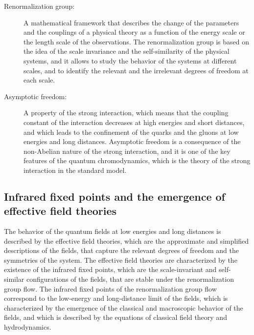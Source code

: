 \begin{tcolorbox}[colback=blue!5!white,colframe=blue!75!black,title=New terms]
\begin{description}
\item[Renormalization group:] A mathematical framework that describes the change of the parameters and the couplings of a physical theory as a function of the energy scale or the length scale of the observations. The renormalization group is based on the idea of the scale invariance and the self-similarity of the physical systems, and it allows to study the behavior of the systems at different scales, and to identify the relevant and the irrelevant degrees of freedom at each scale.
\item[Asymptotic freedom:] A property of the strong interaction, which means that the coupling constant of the interaction decreases at high energies and short distances, and which leads to the confinement of the quarks and the gluons at low energies and long distances. Asymptotic freedom is a consequence of the non-Abelian nature of the strong interaction, and it is one of the key features of the quantum chromodynamics, which is the theory of the strong interaction in the standard model.
\end{description}
\end{tcolorbox}

\subsection{Infrared fixed points and the emergence of effective field theories}
The behavior of the quantum fields at low energies and long distances is described by the effective field theories, which are the approximate and simplified descriptions of the fields, that capture the relevant degrees of freedom and the symmetries of the system. The effective field theories are characterized by the existence of the infrared fixed points, which are the scale-invariant and self-similar configurations of the fields, that are stable under the renormalization group flow. The infrared fixed points of the renormalization group flow correspond to the low-energy and long-distance limit of the fields, which is characterized by the emergence of the classical and macroscopic behavior of the fields, and which is described by the equations of classical field theory and hydrodynamics.


